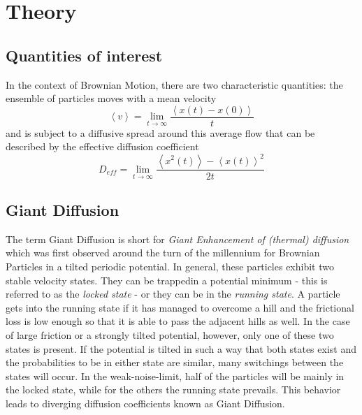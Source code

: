 \documentclass[12pt,a4paper]{article}
\begin{document}
\section{Theory}
\subsection{Quantities of interest}
In the context of Brownian Motion, there are two characteristic quantities: the ensemble of particles moves with a mean velocity
\begin{equation}
\left\langle v\right\rangle =\lim_{t\rightarrow\infty}\frac{\left\langle x(t)-x(0) \right\rangle}{t}
\end{equation}
and is subject to a diffusive spread around this average flow that can be described by the effective diffusion coefficient
\begin{equation}
D_{eff}=\lim_{t\rightarrow\infty}\frac{\left\langle x^2(t) \right\rangle-\left\langle x(t)\right\rangle ^2}{2t}
\end{equation}
\subsection{Giant Diffusion}
The term \glqq Giant Diffusion \grqq is short for \textit{Giant Enhancement of (thermal) diffusion} which was first observed around the turn of the millennium for Brownian Particles in a tilted periodic potential\cite{td}\cite{ga}\cite{dit}\cite{gd}. In general, these particles exhibit two stable velocity states. They can be \glqq trapped\grqq in a potential minimum - this is referred to as the \textit{locked state} - or they can be in the \textit{running state}. A particle gets into the running state if it has managed to overcome a hill and the frictional loss is low enough so that it is able to pass the adjacent hills as well. In the case of large friction or a strongly tilted potential, however, only one of these two states is present. If the potential is tilted in such a way that both states exist and the probabilities to be in either state are similar, many switchings between the states will occur. In the weak-noise-limit, half of the particles will be mainly in the locked state, while for the others the running state prevails. This behavior leads to diverging diffusion coefficients known as Giant Diffusion.
\end{document}
